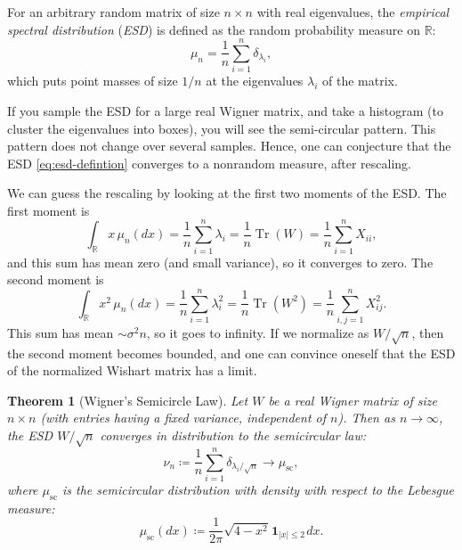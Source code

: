 \documentclass[letterpaper,11pt,oneside,reqno]{article}
\numberwithin{equation}{section}
\newcommand{\ssp}{\hspace{1pt}}
\newtheorem{theorem}[proposition]{Theorem}
\theoremstyle{definition}
\begin{document}
For an arbitrary random matrix of size $n\times n$ with real eigenvalues,
the \emph{empirical spectral distribution} (\emph{ESD}) is defined as the
random probability measure on $\mathbb{R}$:
\begin{equation}
	\label{eq:esd-defintion}
	\mu_n = \frac{1}{n} \sum_{i=1}^n \delta_{\lambda_i},
\end{equation}
which puts point masses of size $1/n$ at the eigenvalues $\lambda_i$ of the matrix.

If you sample the ESD for a large real Wigner matrix,
and take a histogram (to cluster the eigenvalues into boxes),
you will see the semi-circular pattern. This pattern
does not change over several samples. Hence, one can
conjecture that the
ESD \eqref{eq:esd-defintion} converges to a nonrandom
measure, after rescaling.

We can guess the rescaling by looking at the first two moments of the ESD.
The first moment is
\begin{equation*}
	\int_{\mathbb{R}} x \, \mu_n(dx) = \frac{1}{n} \sum_{i=1}^n \lambda_i=
	\frac{1}{n} \operatorname{Tr}(W) =
	\frac{1}{n}\sum_{i=1}^n X_{ii},
\end{equation*}
and this sum has mean zero (and small variance), so it converges to zero.
The second moment is
\begin{equation*}
	\int_{\mathbb{R}} x^2 \, \mu_n(dx) = \frac{1}{n} \sum_{i=1}^n \lambda_i^2=
	\frac{1}{n} \operatorname{Tr}(W^2) =
	\frac{1}{n}
	\sum_{i,j=1}^n X_{ij}^2.
\end{equation*}
This sum has mean $\sim \sigma^2 n$, so it goes to infinity.
If we normalize as $W/\sqrt{n}$, then the second moment
becomes bounded, and one can convince oneself that the
ESD of the normalized Wishart matrix has a limit.

\begin{theorem}[Wigner's Semicircle Law]
	\label{thm:esd-semicircle}
	Let $W$ be a real Wigner matrix of size $n\times n$
	(with entries having a fixed variance, independent of $n$).
	Then
	as $n\to\infty$,
	the ESD $W/\sqrt{n}$ converges in distribution to the semicircular law:
	\begin{equation}
		\label{eq:thm-esd-semicircle}
		\nu_n\coloneqq \frac{1}{n}\sum_{i=1}^{n}\delta_{\lambda_i/\sqrt{n}}
		\longrightarrow \mu_{\mathrm{sc}},
	\end{equation}
	where $\mu_{\mathrm{sc}}$ is the semicircular distribution with density
	with respect to the Lebesgue measure:
	\begin{equation}
		\label{eq:semicircle-density-defintion}
		\mu_{\mathrm{sc}}(dx) \coloneqq \frac{1}{2\pi} \sqrt{4-x^2} \ssp \mathbf{1}_{|x| \leq 2}\ssp
		dx.
	\end{equation}
\end{theorem}
\end{document}
